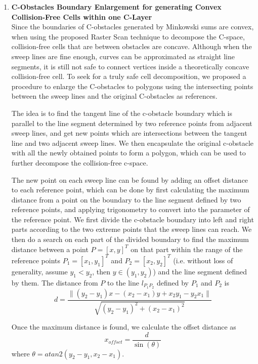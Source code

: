 \documentclass{article}
\begin{document}
\begin{enumerate}
\begin{enumerate}
\end{enumerate}
\newpage

\item{\bf C-Obstacles Boundary Enlargement for generating Convex Collision-Free Cells within one C-Layer}\\
Since the boundaries of C-obstacles generated by Minkowski sums are convex, when using the proposed Raster Scan technique to decompose the C-space, collision-free cells that are between obstacles are concave. Although when the sweep lines are fine enough, curves can be approximated as straight line segments, it is still not safe to connect vertices inside a theoretically concave collision-free cell. To seek for a truly safe cell decomposition, we proposed a procedure to enlarge the C-obstacles to polygons using the intersecting points between the sweep lines and the original C-obstacles as references.

The idea is to find the tangent line of the c-obstacle boundary which is parallel to the line segment determined by two reference points from adjacent sweep lines, and get new points which are intersections between the tangent line and two adjacent sweep lines. We then encapsulate the original c-obstacle with all the newly obtained points to form a polygon, which can be used to further decompose the collision-free c-space.

The new point on each sweep line can be found by adding an offset distance to each reference point, which can be done by first calculating the maximum distance from a point on the boundary to the line segment defined by two reference points, and applying trigonometry to convert into the parameter of the reference point. We first divide the c-obstacle boundary into left and right parts according to the two extreme points that the sweep lines can reach. We then do a search on each part of the divided boundary to find the maximum distance between a point $P = [x, y]^T$ on that part within the range of the reference points $P_1 = [x_1, y_1]^T$ and $P_2 = [x_2, y_2]^T$ (i.e. without loss of generality, assume $y_1 < y_2$, then $y \in (y_1, y_2)$) and the line segment defined by them. The distance from $P$ to the line $l_{P_1P_2}$ defined by $P_1$ and $P_2$ is
\begin{equation}
	d = \frac{\| (y_2-y_1)x - (x_2-x_1)y + x_2y_1 - y_2x_1 \|}{\sqrt{(y_2 - y_1)^2 + (x_2 - x_1)^2}}
\end{equation}

Once the maximum distance is found, we calculate the offset distance as
\begin{equation}
	x_{offset} = \frac{d}{\sin(\theta)}
\end{equation}
where $\theta = atan2 (y_2-y_1, x_2-x_1)$.


\end{enumerate}
\end{document}
